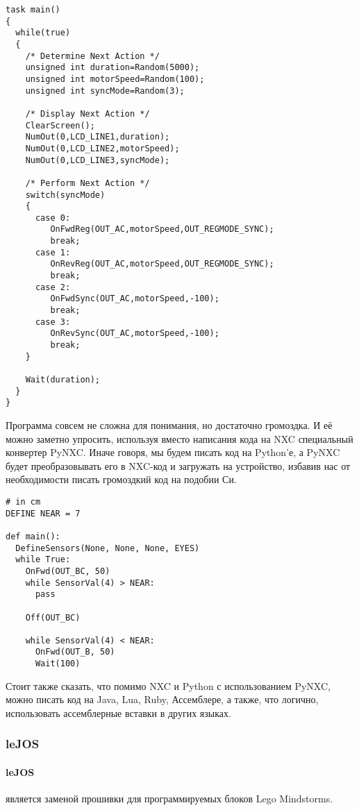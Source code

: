 \begin{lstlisting}[caption={Пример кода для приведения робота в движение}]
task main()
{
  while(true)
  {
    /* Determine Next Action */
    unsigned int duration=Random(5000);
    unsigned int motorSpeed=Random(100);
    unsigned int syncMode=Random(3);
 
    /* Display Next Action */
    ClearScreen();
    NumOut(0,LCD_LINE1,duration);
    NumOut(0,LCD_LINE2,motorSpeed);
    NumOut(0,LCD_LINE3,syncMode);
 
    /* Perform Next Action */
    switch(syncMode)
    {
      case 0:
         OnFwdReg(OUT_AC,motorSpeed,OUT_REGMODE_SYNC);
         break;
      case 1:
         OnRevReg(OUT_AC,motorSpeed,OUT_REGMODE_SYNC);
         break;
      case 2:
         OnFwdSync(OUT_AC,motorSpeed,-100);
         break;
      case 3:
         OnRevSync(OUT_AC,motorSpeed,-100);
         break;
    }
    
    Wait(duration);
  }
}
\end{lstlisting}

Программа совсем не сложна для понимания, но достаточно громоздка. И её можно заметно упросить, используя вместо написания кода на NXC специальный конвертер PyNXC. Иначе говоря, мы будем писать код на Python'е, а PyNXC будет преобразовывать его в NXC-код и загружать на устройство, избавив нас от необходимости писать громоздкий код на подобии Си.

\begin{lstlisting}[caption={Пример кода для языее Python робота в движение}]
# in cm
DEFINE NEAR = 7
 
def main():
  DefineSensors(None, None, None, EYES)
  while True:
    OnFwd(OUT_BC, 50)
    while SensorVal(4) > NEAR:
      pass
    
    Off(OUT_BC)
    
    while SensorVal(4) < NEAR:
      OnFwd(OUT_B, 50)
      Wait(100)
\end{lstlisting}

Стоит также сказать, что помимо NXC и Python с использованием PyNXC, можно писать код на Java, Lua, Ruby, Ассемблере, а также, что логично, использовать ассемблерные вставки в других языках.

\subsubsection{leJOS}

\paragraph{leJOS} является заменой прошивки для программируемых блоков Lego Mindstorms.

